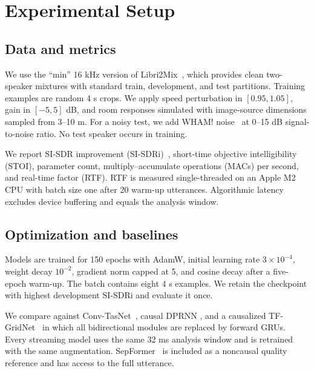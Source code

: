 \section{Experimental Setup}
\label{sec:setup}

\subsection{Data and metrics}

We use the ``min'' 16 kHz version of Libri2Mix~\cite{cosentino2020librimix},
which provides clean two-speaker mixtures with standard train, development, and
test partitions.  Training examples are random 4 s crops.  We apply speed
perturbation in $[0.95,1.05]$, gain in $[-5,5]$ dB, and room responses simulated
with image-source dimensions sampled from 3--10 m.  For a noisy test, we add
WHAM! noise~\cite{wichern2019wham} at 0--15 dB signal-to-noise ratio.  No test
speaker occurs in training.

We report SI-SDR improvement (SI-SDRi)~\cite{leroux2019sdr}, short-time objective
intelligibility (STOI), parameter count, multiply--accumulate operations (MACs)
per second, and real-time factor (RTF).  RTF is measured single-threaded on an
Apple M2 CPU with batch size one after 20 warm-up utterances.  Algorithmic
latency excludes device buffering and equals the analysis window.

\subsection{Optimization and baselines}

Models are trained for 150 epochs with AdamW, initial learning rate
$3\times10^{-4}$, weight decay $10^{-2}$, gradient norm capped at 5, and cosine
decay after a five-epoch warm-up.  The batch contains eight 4 s examples.  We
retain the checkpoint with highest development SI-SDRi and evaluate it once.

We compare against Conv-TasNet~\cite{luo2019convtasnet}, causal DPRNN
\cite{luo2020dprnn}, and a causalized TF-GridNet~\cite{wang2023tfgridnet} in which
all bidirectional modules are replaced by forward GRUs.  Every streaming model
uses the same 32 ms analysis window and is retrained with the same augmentation.
SepFormer~\cite{subakan2021sepformer} is included as a noncausal quality
reference and has access to the full utterance.
